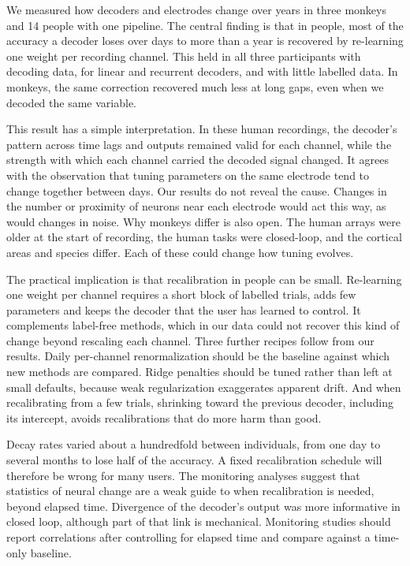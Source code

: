 \documentclass[pdflatex,sn-nature]{sn-jnl}
\begin{document}
We measured how decoders and electrodes change over years in three monkeys and 14 people with one pipeline. The
central finding is that in people, most of the accuracy a decoder loses over days to more than a year is recovered by
re-learning one weight per recording channel. This held in all three participants with decoding data, for linear and
recurrent decoders, and with little labelled data. In monkeys, the same correction recovered much less at long gaps,
even when we decoded the same variable.

This result has a simple interpretation. In these human recordings, the decoder's pattern across time lags and
outputs remained valid for each channel, while the strength with which each channel carried the decoded signal changed.
It agrees with the observation that tuning parameters on the same electrode tend to change together between
days\cite{bishop2014}. Our results do not reveal the cause. Changes in the number or proximity of neurons near each
electrode would act this way\cite{polikov2005,kozai2015}, as would changes in noise. Why monkeys differ is also open.
The human arrays were older at the start of recording, the human tasks were closed-loop, and the cortical areas and
species differ. Each of these could change how tuning evolves.

The practical implication is that recalibration in people can be small. Re-learning one weight per channel requires a
short block of labelled trials, adds few parameters and keeps the decoder that the user has learned to control. It
complements label-free methods, which in our data could not recover this kind of change beyond rescaling each channel.
Three further recipes follow from our results. Daily per-channel renormalization should be the baseline against which
new methods are compared. Ridge penalties should be tuned rather than left at small defaults, because weak
regularization exaggerates apparent drift. And when recalibrating from a few trials, shrinking toward the previous
decoder, including its intercept, avoids recalibrations that do more harm than good.

Decay rates varied about a hundredfold between individuals, from one day to several months to lose half of the accuracy.
A fixed recalibration schedule will therefore be wrong for many users. The monitoring analyses suggest that statistics
of neural change are a weak guide to when recalibration is needed, beyond elapsed time. Divergence of the decoder's
output was more informative in closed loop, although part of that link is mechanical. Monitoring studies should report
correlations after controlling for elapsed time and compare against a time-only baseline.
\end{document}
